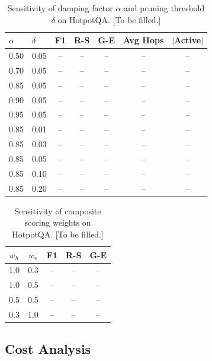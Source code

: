 \documentclass[11pt,a4paper]{article}
\begin{document}
\begin{table}[ht]
\centering
\caption{Sensitivity of damping factor $\alpha$ and pruning threshold $\delta$ on HotpotQA. [To be filled.]}
\label{tab:sens_prop}
\begin{tabular}{ll ccc cc}
\toprule
$\alpha$ & $\delta$ & F1 & R-S & G-E & Avg Hops & $|$Active$|$ \\
\midrule
0.50 & 0.05 & -- & -- & -- & -- & -- \\
0.70 & 0.05 & -- & -- & -- & -- & -- \\
0.85 & 0.05 & -- & -- & -- & -- & -- \\
0.90 & 0.05 & -- & -- & -- & -- & -- \\
0.95 & 0.05 & -- & -- & -- & -- & -- \\
\midrule
0.85 & 0.01 & -- & -- & -- & -- & -- \\
0.85 & 0.03 & -- & -- & -- & -- & -- \\
0.85 & 0.05 & -- & -- & -- & -- & -- \\
0.85 & 0.10 & -- & -- & -- & -- & -- \\
0.85 & 0.20 & -- & -- & -- & -- & -- \\
\bottomrule
\end{tabular}
\end{table}

\begin{table}[ht]
\centering
\caption{Sensitivity of composite scoring weights on HotpotQA. [To be filled.]}
\label{tab:sens_scoring}
\begin{tabular}{cc ccc}
\toprule
$w_h$ & $w_e$ & F1 & R-S & G-E \\
\midrule
1.0 & 0.3 & -- & -- & -- \\
1.0 & 0.5 & -- & -- & -- \\
0.5 & 0.5 & -- & -- & -- \\
0.3 & 1.0 & -- & -- & -- \\
\bottomrule
\end{tabular}
\end{table}

\subsection{Cost Analysis}
\end{document}
